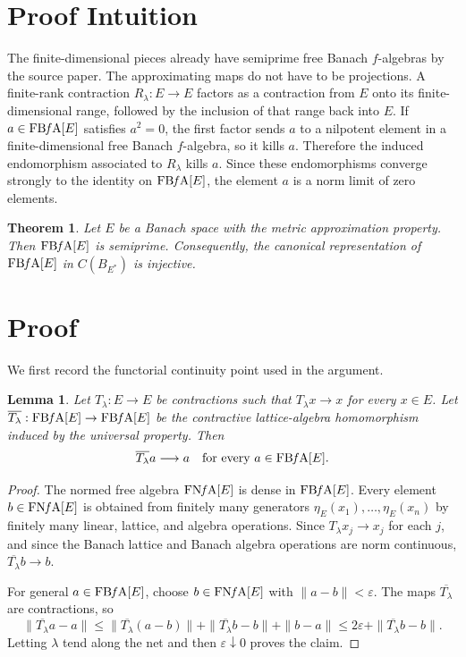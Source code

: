 \documentclass[11pt]{article}
\newtheorem{theorem}{Theorem}
\newtheorem{lemma}{Lemma}
\newcommand{\FBFA}[1]{\operatorname{FB{\it f}A}[#1]}
\newcommand{\FNFA}[1]{\operatorname{FN{\it f}A}[#1]}
\begin{document}
\section*{Proof Intuition}

The finite-dimensional pieces already have semiprime free Banach
\(f\)-algebras by the source paper.  The approximating maps do not have
to be projections.  A finite-rank contraction \(R_\lambda:E\to E\)
factors as a contraction from \(E\) onto its finite-dimensional range,
followed by the inclusion of that range back into \(E\).  If
\(a\in\FBFA{E}\) satisfies \(a^2=0\), the first factor sends \(a\) to a
nilpotent element in a finite-dimensional free Banach \(f\)-algebra, so
it kills \(a\).  Therefore the induced endomorphism associated to
\(R_\lambda\) kills \(a\).  Since these endomorphisms converge strongly
to the identity on \(\FBFA{E}\), the element \(a\) is a norm limit of
zero elements.

\begin{theorem}
Let \(E\) be a Banach space with the metric approximation property.
Then \(\FBFA{E}\) is semiprime.  Consequently, the canonical
representation of \(\FBFA{E}\) in \(C(B_{E^*})\) is injective.
\end{theorem}

\section*{Proof}

We first record the functorial continuity point used in the argument.

\begin{lemma}
Let \(T_\lambda:E\to E\) be contractions such that \(T_\lambda x\to x\)
for every \(x\in E\).  Let
\(\overline{T_\lambda}:\FBFA{E}\to\FBFA{E}\) be the contractive
lattice-algebra homomorphism induced by the universal property.  Then
\[
\overline{T_\lambda}a\longrightarrow a
\quad\text{for every }a\in\FBFA{E}.
\]
\end{lemma}

\begin{proof}
The normed free algebra \(\FNFA{E}\) is dense in \(\FBFA{E}\).  Every
element \(b\in\FNFA{E}\) is obtained from finitely many generators
\(\eta_E(x_1),\ldots,\eta_E(x_n)\) by finitely many linear, lattice, and
algebra operations.  Since \(T_\lambda x_j\to x_j\) for each \(j\), and
since the Banach lattice and Banach algebra operations are norm
continuous, \(\overline{T_\lambda}b\to b\).

For general \(a\in\FBFA{E}\), choose \(b\in\FNFA{E}\) with
\(\|a-b\|<\varepsilon\).  The maps \(\overline{T_\lambda}\) are
contractions, so
\[
\|\overline{T_\lambda}a-a\|
\leq
\|\overline{T_\lambda}(a-b)\|
+\|\overline{T_\lambda}b-b\|
+\|b-a\|
\leq
2\varepsilon+\|\overline{T_\lambda}b-b\|.
\]
Letting \(\lambda\) tend along the net and then \(\varepsilon\downarrow0\)
proves the claim.
\end{proof}
\end{document}
